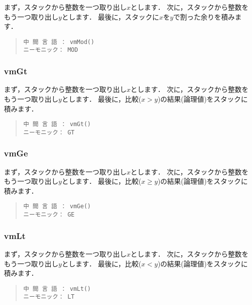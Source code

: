 まず，スタックから整数を一つ取り出し$x$とします．
次に，スタックから整数をもう一つ取り出し$y$とします．
最後に，スタックに$x$を$y$で割った余りを積みます．

\begin{quote}
\begin{verbatim}
中 間 言 語 ： vmMod()
ニーモニック： MOD
\end{verbatim}
\end{quote}

\subsubsection{vmGt}

まず，スタックから整数を一つ取り出し$x$とします．
次に，スタックから整数をもう一つ取り出し$y$とします．
最後に，比較($x > y$)の結果(論理値)をスタックに積みます．

\begin{quote}
\begin{verbatim}
中 間 言 語 ： vmGt()
ニーモニック： GT
\end{verbatim}
\end{quote}

\subsubsection{vmGe}

まず，スタックから整数を一つ取り出し$x$とします．
次に，スタックから整数をもう一つ取り出し$y$とします．
最後に，比較($x \ge y$)の結果(論理値)をスタックに積みます．

\begin{quote}
\begin{verbatim}
中 間 言 語 ： vmGe()
ニーモニック： GE
\end{verbatim}
\end{quote}

\subsubsection{vmLt}

まず，スタックから整数を一つ取り出し$x$とします．
次に，スタックから整数をもう一つ取り出し$y$とします．
最後に，比較($x < y$)の結果(論理値)をスタックに積みます．

\begin{quote}
\begin{verbatim}
中 間 言 語 ： vmLt()
ニーモニック： LT
\end{verbatim}
\end{quote}

